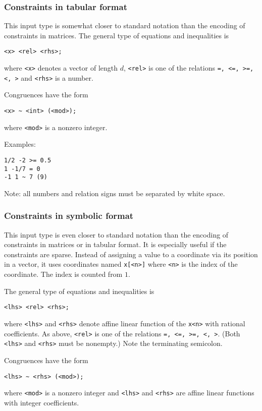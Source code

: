 \documentclass[12pt,a4paper]{scrartcl}
\theoremstyle{definition}
\begin{document}
\subsubsection{Constraints in tabular format}\label{const_syntax}

This input type is somewhat closer to standard notation than the encoding of constraints in matrices. The general type of equations and inequalities is
\begin{Verbatim}
<x> <rel> <rhs>;
\end{Verbatim}
where \verb|<x>| denotes a vector of length $d$, \verb|<rel>| is one of the relations \verb|=, <=, >=, <, >| and \verb|<rhs>| is a number.

Congruences have the form
\begin{Verbatim}
<x> ~ <int> (<mod>);
\end{Verbatim}
where \verb|<mod>| is a nonzero integer.

Examples:
\begin{Verbatim}
1/2 -2 >= 0.5
1 -1/7 = 0
-1 1 ~ 7 (9)
\end{Verbatim}

Note: all numbers and relation signs must be separated by white space.

\subsubsection{Constraints in symbolic format}\label{symb_syntax}

This input type is even closer to standard notation than the encoding of constraints in matrices or in tabular format. It is especially useful if the constraints are sparse. Instead of assigning a value to a coordinate via its position in a vector, it uses coordinates named \verb|x[<n>]| where \verb|<n>| is the index of the coordinate. The index is counted from $1$. 

The general type of equations and inequalities is
\begin{Verbatim}
<lhs> <rel> <rhs>;
\end{Verbatim}
where \verb|<lhs>| and \verb|<rhs>| denote affine linear function of the \verb|x<n>| with rational coefficients. 
As above, \verb|<rel>| is one of the relations \verb|=, <=, >=, <, >|. (Both \verb|<lhs>| and \verb|<rhs>| must be nonempty.) Note the terminating semicolon.

Congruences have the form
\begin{Verbatim}
<lhs> ~ <rhs> (<mod>);
\end{Verbatim}
where \verb|<mod>| is a nonzero integer and \verb|<lhs>| and \verb|<rhs>| are affine linear functions with integer coefficients.
\end{document}
